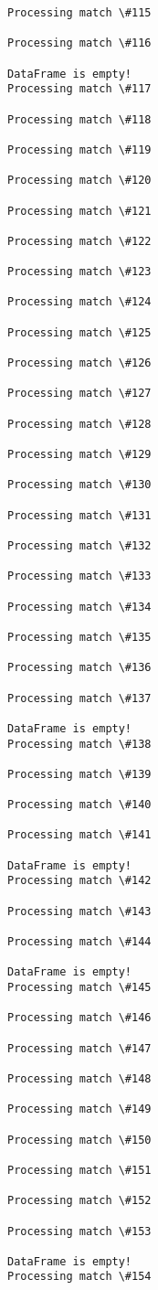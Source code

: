 \documentclass[11pt]{article}
\begin{document}
\begin{Verbatim}[commandchars=\\\{\}]
Processing match \#115

Processing match \#116

DataFrame is empty!
Processing match \#117

Processing match \#118

Processing match \#119

Processing match \#120

Processing match \#121

Processing match \#122

Processing match \#123

Processing match \#124

Processing match \#125

Processing match \#126

Processing match \#127

Processing match \#128

Processing match \#129

Processing match \#130

Processing match \#131

Processing match \#132

Processing match \#133

Processing match \#134

Processing match \#135

Processing match \#136

Processing match \#137

DataFrame is empty!
Processing match \#138

Processing match \#139

Processing match \#140

Processing match \#141

DataFrame is empty!
Processing match \#142

Processing match \#143

Processing match \#144

DataFrame is empty!
Processing match \#145

Processing match \#146

Processing match \#147

Processing match \#148

Processing match \#149

Processing match \#150

Processing match \#151

Processing match \#152

Processing match \#153

DataFrame is empty!
Processing match \#154


\end{Verbatim}
\end{document}
